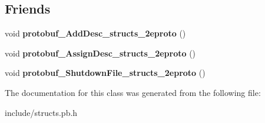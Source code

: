 \subsection*{Friends}
\begin{DoxyCompactItemize}
\item 
\hypertarget{classstruct_definitions_1_1_edge_abcf9b7cc173b6d79696d01156751b8ce}{}\label{classstruct_definitions_1_1_edge_abcf9b7cc173b6d79696d01156751b8ce} 
void {\bfseries protobuf\+\_\+\+Add\+Desc\+\_\+structs\+\_\+2eproto} ()
\item 
\hypertarget{classstruct_definitions_1_1_edge_adb32752ff5178cb902966da6e3cb3bc6}{}\label{classstruct_definitions_1_1_edge_adb32752ff5178cb902966da6e3cb3bc6} 
void {\bfseries protobuf\+\_\+\+Assign\+Desc\+\_\+structs\+\_\+2eproto} ()
\item 
\hypertarget{classstruct_definitions_1_1_edge_ac2e4278d7604361fa6502b1cfbf9d980}{}\label{classstruct_definitions_1_1_edge_ac2e4278d7604361fa6502b1cfbf9d980} 
void {\bfseries protobuf\+\_\+\+Shutdown\+File\+\_\+structs\+\_\+2eproto} ()
\end{DoxyCompactItemize}


The documentation for this class was generated from the following file\+:\begin{DoxyCompactItemize}
\item 
include/structs.\+pb.\+h\end{DoxyCompactItemize}

